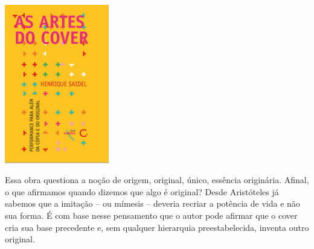 \begin{center}
\hspace{-.5cm}\includegraphics[width=45.4mm]{./imgs/cover.jpg}
\end{center}

\hspace*{-7cm}\hrulefill\hspace*{-7cm}

\medskip

\noindent{}Essa obra questiona a noção de origem, original, único, essência originária. Afinal, o que afirmamos quando dizemos que algo é original? Desde Aristóteles já sabemos que a imitação – ou mímesis – deveria recriar a potência de vida e não sua forma. É com base nesse pensamento que o autor pode afirmar que o cover cria {} sua base precedente e, sem qualquer hierarquia preestabelecida, inventa outro original.

\vfill

\hspace*{-.4cm}\begin{minipage}[c]{1\linewidth}
\small{
{}}
\end{minipage}

\pagebreak

\hspace{.5cm}


